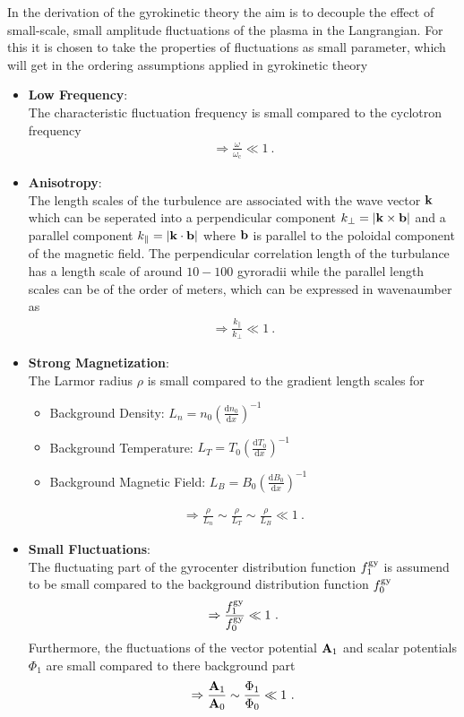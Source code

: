 In the derivation of the gyrokinetic theory the aim is to decouple the effect of small-scale, small amplitude fluctuations of the plasma in the Langrangian. For this it is chosen to take the properties of fluctuations as small parameter, which will get in the ordering assumptions applied in gyrokinetic theory

\begin{itemize}
	\item \textbf{Low Frequency}:\\
		The characteristic fluctuation frequency is small compared to the cyclotron frequency 
		\begin{gather*}
			\Rightarrow \frac{\omega}{\omega_\mathrm{c}} \ll 1~.
		\end{gather*}
	\item \textbf{Anisotropy}:\\
		The length scales of the turbulence are associated with the wave vector $\boldsymbol{\mathbf{k}}$ which can be seperated into a perpendicular component $k_\perp = |\boldsymbol{\mathbf{k}} \times \boldsymbol{\mathbf{b}}|$ and a parallel component $k_\parallel = |\boldsymbol{\mathbf{k}} \cdot \boldsymbol{\mathbf{b}}|$ where $\boldsymbol{\mathbf{b}}$ is parallel to the poloidal component of the magnetic field. The perpendicular correlation length of the turbulance has a length scale of around $10 - 100$ gyroradii while the parallel length scales can be of the order of meters, which can be expressed in wavenaumber as
		\begin{gather*}
			\Rightarrow \frac{k_\parallel}{k_\perp} \ll 1~.
		\end{gather*}
	\item \textbf{Strong Magnetization}:\\
		The Larmor radius $\rho$ is small compared to the gradient length scales for
		\begin{itemize}
			\item Background Density: $L_n = n_0 \left(\frac{\mathrm{d}n_0}{\mathrm{d}x}\right)^{-1}$
			\item Background Temperature: $L_T = T_0 \left(\frac{\mathrm{d}T_0}{\mathrm{d}x}\right)^{-1}$
			\item Background Magnetic Field: $L_B = B_0 \left(\frac{\mathrm{d}B_0}{\mathrm{d}x}\right)^{-1}$
		\end{itemize}
		\begin{gather*}
			\Rightarrow \frac{\rho}{L_n} \sim \frac{\rho}{L_T} \sim \frac{\rho}{L_B}\ll 1~.
		\end{gather*}
	\item \textbf{Small Fluctuations}:\\
		The fluctuating part of the gyrocenter distribution function $f^{\mathrm{gy}}_1$ is assumend to be small compared to the background distribution function $f^{\mathrm{gy}}_0$ 
		\begin{gather*}
			\Rightarrow \frac{f^{\mathrm{gy}}_1}{f^{\mathrm{gy}}_0} \ll 1~.
		\end{gather*}
		Furthermore, the fluctuations of the vector potential $\boldsymbol{\mathbf{A}}_1$ and scalar potentials $\Phi_1$ are small compared to there background part
		\begin{gather*}
			\Rightarrow \frac{\boldsymbol{\mathbf{A}}_1}{\boldsymbol{\mathbf{A}}_0} \sim \frac{\Phi_1}{\Phi_0}  \ll 1~.
		\end{gather*}
\end{itemize}
